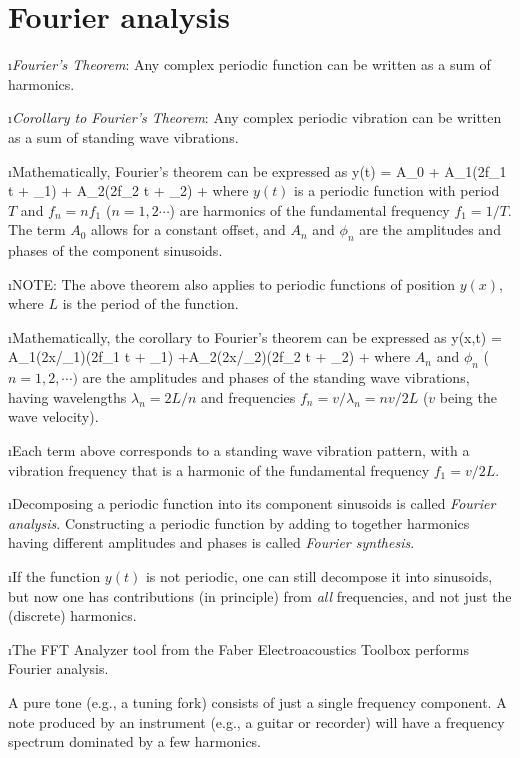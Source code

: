 \section{Fourier analysis}
\label{s:fourier}

\bi

\i {\em Fourier's Theorem}:
Any complex periodic function can be
written as a sum of harmonics.

\i {\em Corollary to Fourier's Theorem}:
Any complex periodic vibration can be
written as a sum of standing wave vibrations.

\i Mathematically, Fourier's theorem can be expressed as
%
\be
y(t) = A_0
+ A_1\sin(2\pi f_1 t + \phi_1)
+ A_2\sin(2\pi f_2 t + \phi_2)
+ \cdots
\ee
%
where $y(t)$ is a periodic function with period $T$
and $f_n=n f_1$ ($n=1,2\cdots$) are harmonics of 
the fundamental frequency $f_1= 1/T$.
The term $A_0$ allows for a constant offset, and 
$A_n$ and $\phi_n$ are the amplitudes and phases of 
the component sinusoids.

\i NOTE: The above theorem also applies to periodic
functions of position $y(x)$, where $L$ is the 
period of the function.

\i Mathematically, the corollary to Fourier's theorem
can be expressed as
%
\be
y(x,t) =
A_1\sin(2\pi x/\lambda_1)\cos(2\pi f_1 t + \phi_1)
+A_2\sin(2\pi x/\lambda_2)\cos(2\pi f_2 t + \phi_2)
+\cdots
\ee
%
where $A_n$ and $\phi_n$ ($n=1,2,\cdots)$
are the amplitudes and phases of the standing 
wave vibrations, having wavelengths
$\lambda_n = 2L/n$ and frequencies
$f_n = v/\lambda_n=nv/2L$
($v$ being the wave velocity).

\i Each term above corresponds to a standing
wave vibration pattern, with a vibration
frequency that is a harmonic of the fundamental
frequency $f_1=v/2L$.


\i Decomposing a periodic function into its component
sinusoids is called {\em Fourier analysis}.
Constructing a periodic function by adding to 
together harmonics having different amplitudes and
phases is called {\em Fourier synthesis}.

\i If the function $y(t)$ is not periodic, one can
still decompose it into sinusoids, but now one has
contributions (in principle) from {\em all} frequencies,
and not just the (discrete) harmonics.

\i \demo The FFT Analyzer tool from the Faber 
Electroacoustics Toolbox performs Fourier analysis.

A pure tone (e.g., a tuning fork) consists 
of just a single frequency component.
A note produced by an instrument (e.g., a guitar or
recorder) will have a frequency spectrum dominated by
a few harmonics.

